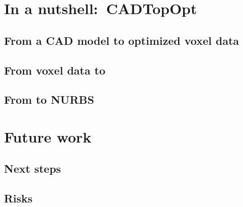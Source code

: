 \section{In a nutshell:\ \acl{CADTopOpt}}
\subsection{From a \acs{CAD} model to optimized voxel data}
\subsection{From voxel data to }
\subsection{From  to \ac{NURBS}}

\section{Future work}

\subsection{Next steps}
\subsection{Risks}
